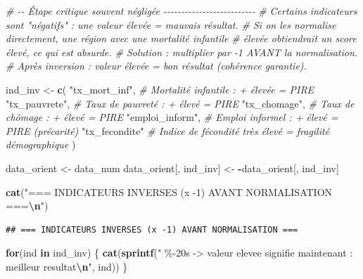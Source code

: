 \documentclass[
]{article}
\newenvironment{Shaded}{\begin{snugshade}}{\end{snugshade}}
\newcommand{\CommentTok}[1]{\textcolor[rgb]{0.56,0.35,0.01}{\textit{#1}}}
\newcommand{\ControlFlowTok}[1]{\textcolor[rgb]{0.13,0.29,0.53}{\textbf{#1}}}
\newcommand{\FunctionTok}[1]{\textcolor[rgb]{0.13,0.29,0.53}{\textbf{#1}}}
\newcommand{\NormalTok}[1]{#1}
\newcommand{\OtherTok}[1]{\textcolor[rgb]{0.56,0.35,0.01}{#1}}
\newcommand{\SpecialCharTok}[1]{\textcolor[rgb]{0.81,0.36,0.00}{\textbf{#1}}}
\newcommand{\StringTok}[1]{\textcolor[rgb]{0.31,0.60,0.02}{#1}}
\begin{document}
\begin{Shaded}
\begin{Highlighting}[]
\CommentTok{\# {-}{-} Étape critique souvent négligée {-}{-}{-}{-}{-}{-}{-}{-}{-}{-}{-}{-}{-}{-}{-}{-}{-}{-}{-}{-}{-}{-}{-}{-}{-}{-}}
\CommentTok{\# Certains indicateurs sont "négatifs" : une valeur élevée = mauvais résultat.}
\CommentTok{\# Si on les normalise directement, une région avec une mortalité infantile}
\CommentTok{\# élevée obtiendrait un score élevé, ce qui est absurde.}
\CommentTok{\# Solution : multiplier par {-}1 AVANT la normalisation.}
\CommentTok{\# Après inversion : valeur élevée = bon résultat (cohérence garantie).}

\NormalTok{ind\_inv }\OtherTok{\textless{}{-}} \FunctionTok{c}\NormalTok{(}
  \StringTok{"tx\_mort\_inf"}\NormalTok{,   }\CommentTok{\# Mortalité infantile : + élevée = PIRE}
  \StringTok{"tx\_pauvrete"}\NormalTok{,   }\CommentTok{\# Taux de pauvreté : + élevé = PIRE}
  \StringTok{"tx\_chomage"}\NormalTok{,    }\CommentTok{\# Taux de chômage : + élevé = PIRE}
  \StringTok{"emploi\_inform"}\NormalTok{, }\CommentTok{\# Emploi informel : + élevé = PIRE (précarité)}
  \StringTok{"tx\_fecondite"}   \CommentTok{\# Indice de fécondité très élevé = fragilité démographique}
\NormalTok{)}

\NormalTok{data\_orient }\OtherTok{\textless{}{-}}\NormalTok{ data\_num}
\NormalTok{data\_orient[, ind\_inv] }\OtherTok{\textless{}{-}} \SpecialCharTok{{-}}\NormalTok{data\_orient[, ind\_inv]}

\FunctionTok{cat}\NormalTok{(}\StringTok{"=== INDICATEURS INVERSES (x {-}1) AVANT NORMALISATION ===}\SpecialCharTok{\textbackslash{}n}\StringTok{"}\NormalTok{)}
\end{Highlighting}
\end{Shaded}

\begin{verbatim}
## === INDICATEURS INVERSES (x -1) AVANT NORMALISATION ===
\end{verbatim}

\begin{Shaded}
\begin{Highlighting}[]
\ControlFlowTok{for}\NormalTok{(ind }\ControlFlowTok{in}\NormalTok{ ind\_inv) \{}
  \FunctionTok{cat}\NormalTok{(}\FunctionTok{sprintf}\NormalTok{(}\StringTok{"  \%{-}20s {-}\textgreater{} valeur elevee signifie maintenant : meilleur resultat}\SpecialCharTok{\textbackslash{}n}\StringTok{"}\NormalTok{, ind))}
\NormalTok{\}}
\end{Highlighting}
\end{Shaded}
\end{document}
